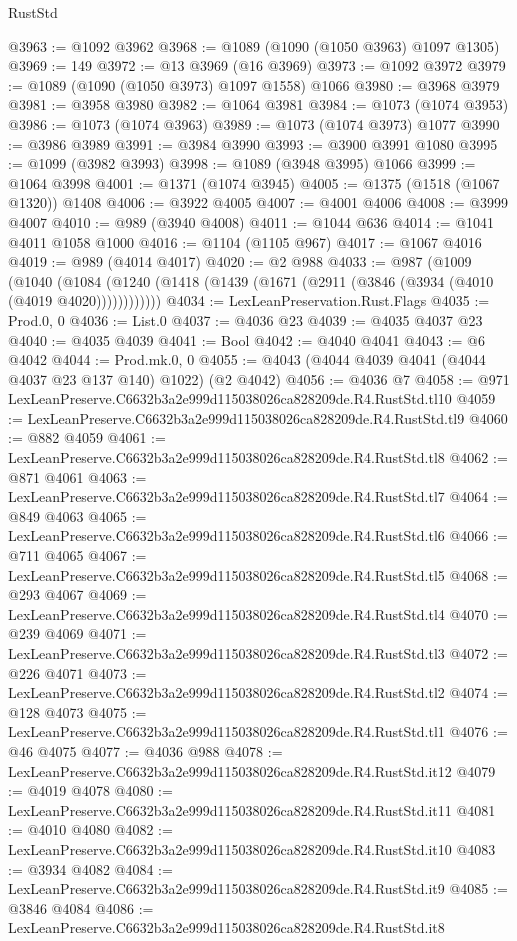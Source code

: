 \begin{lexlean}{RustStd}
\begin{coremodule}
@3963 := @1092 @3962
@3968 := @1089 (@1090 (@1050 @3963) @1097 @1305)
@3969 := 149
@3972 := @13 @3969 (@16 @3969)
@3973 := @1092 @3972
@3979 := @1089 (@1090 (@1050 @3973) @1097 @1558) @1066
@3980 := @3968 @3979
@3981 := @3958 @3980
@3982 := @1064 @3981
@3984 := @1073 (@1074 @3953)
@3986 := @1073 (@1074 @3963)
@3989 := @1073 (@1074 @3973) @1077
@3990 := @3986 @3989
@3991 := @3984 @3990
@3993 := @3900 @3991 @1080
@3995 := @1099 (@3982 @3993)
@3998 := @1089 (@3948 @3995) @1066
@3999 := @1064 @3998
@4001 := @1371 (@1074 @3945)
@4005 := @1375 (@1518 (@1067 @1320)) @1408
@4006 := @3922 @4005
@4007 := @4001 @4006
@4008 := @3999 @4007
@4010 := @989 (@3940 @4008)
@4011 := @1044 @636
@4014 := @1041 @4011 @1058 @1000
@4016 := @1104 (@1105 @967)
@4017 := @1067 @4016
@4019 := @989 (@4014 @4017)
@4020 := @2 @988
@4033 := @987
    (@1009
      (@1040 (@1084 (@1240 (@1418 (@1439 (@1671 (@2911 (@3846 (@3934 (@4010 (@4019 @4020))))))))))))
@4034 := LexLeanPreservation.Rust.Flags
@4035 := Prod.{0, 0}
@4036 := List.{0}
@4037 := @4036 @23
@4039 := @4035 @4037 @23
@4040 := @4035 @4039
@4041 := Bool
@4042 := @4040 @4041
@4043 := @6 @4042
@4044 := Prod.mk.{0, 0}
@4055 := @4043 (@4044 @4039 @4041 (@4044 @4037 @23 @137 @140) @1022) (@2 @4042)
@4056 := @4036 @7
@4058 := @971 LexLeanPreserve.C6632b3a2e999d115038026ca828209de.R4.RustStd.tl10
@4059 := LexLeanPreserve.C6632b3a2e999d115038026ca828209de.R4.RustStd.tl9
@4060 := @882 @4059
@4061 := LexLeanPreserve.C6632b3a2e999d115038026ca828209de.R4.RustStd.tl8
@4062 := @871 @4061
@4063 := LexLeanPreserve.C6632b3a2e999d115038026ca828209de.R4.RustStd.tl7
@4064 := @849 @4063
@4065 := LexLeanPreserve.C6632b3a2e999d115038026ca828209de.R4.RustStd.tl6
@4066 := @711 @4065
@4067 := LexLeanPreserve.C6632b3a2e999d115038026ca828209de.R4.RustStd.tl5
@4068 := @293 @4067
@4069 := LexLeanPreserve.C6632b3a2e999d115038026ca828209de.R4.RustStd.tl4
@4070 := @239 @4069
@4071 := LexLeanPreserve.C6632b3a2e999d115038026ca828209de.R4.RustStd.tl3
@4072 := @226 @4071
@4073 := LexLeanPreserve.C6632b3a2e999d115038026ca828209de.R4.RustStd.tl2
@4074 := @128 @4073
@4075 := LexLeanPreserve.C6632b3a2e999d115038026ca828209de.R4.RustStd.tl1
@4076 := @46 @4075
@4077 := @4036 @988
@4078 := LexLeanPreserve.C6632b3a2e999d115038026ca828209de.R4.RustStd.it12
@4079 := @4019 @4078
@4080 := LexLeanPreserve.C6632b3a2e999d115038026ca828209de.R4.RustStd.it11
@4081 := @4010 @4080
@4082 := LexLeanPreserve.C6632b3a2e999d115038026ca828209de.R4.RustStd.it10
@4083 := @3934 @4082
@4084 := LexLeanPreserve.C6632b3a2e999d115038026ca828209de.R4.RustStd.it9
@4085 := @3846 @4084
@4086 := LexLeanPreserve.C6632b3a2e999d115038026ca828209de.R4.RustStd.it8

\end{coremodule}
\end{lexlean}
